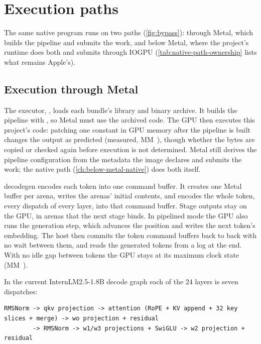 \chapter{Execution paths}\label{ch:executing}

The same native program runs on two paths (\cref{fig:bypass}): through Metal, which builds the pipeline and submits
the work, and below Metal, where the project's runtime does both and submits through IOGPU
(\cref{tab:native-path-ownership} lists what remains Apple's).

\section{Execution through Metal}\label{ch:through-metal}

The executor, , loads each bundle's library and
binary archive. It builds the pipeline with , so Metal must use the
archived code. The GPU then executes this project's code: patching one constant in GPU memory after the pipeline is built
changes the output as predicted (measured, MM~), though whether the bytes are copied or checked again
before execution is not determined. Metal still derives the pipeline configuration from the
metadata the image declares and submits the work; the native path (\cref{ch:below-metal-native}) does both itself.

decodegen encodes each token into one command buffer. It creates one Metal buffer per arena, writes the arenas'
initial contents, and encodes the whole token, every dispatch of every layer, into that command buffer. Stage outputs stay on the
GPU, in arenas that the next stage binds. In pipelined mode the GPU also runs the generation step, which advances
the position and writes the next token's embedding. The host then commits the token command buffers back to back
with no wait between them, and reads the generated tokens from a log at the end. With no idle gap between tokens the
GPU stays at its maximum clock state (MM~).

In the current InternLM2.5-1.8B decode graph each of the 24 layers is seven dispatches:

\begin{lstlisting}
RMSNorm -> qkv projection -> attention (RoPE + KV append + 32 key slices + merge) -> wo projection + residual
        -> RMSNorm -> w1/w3 projections + SwiGLU -> w2 projection + residual
\end{lstlisting}

